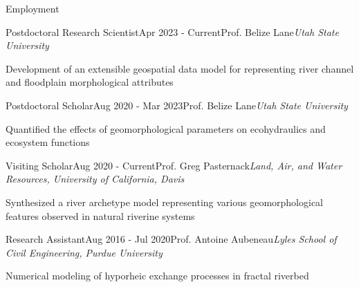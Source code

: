 \documentclass{resume_anzy} %
\begin{document}

\begin{rSection}{Employment}


\begin{rSubsection}{Postdoctoral Research Scientist}{Apr 2023 - Current}{Prof. Belize Lane}{\textit{Utah State University}}
\item  Development of an extensible geospatial data model for representing river channel and floodplain morphological attributes 
\end{rSubsection}

\begin{rSubsection}{Postdoctoral Scholar}{Aug 2020 - Mar 2023}{Prof. Belize Lane}{\textit{Utah State University}}
\item  Quantified the effects of geomorphological parameters on ecohydraulics and ecosystem functions
\end{rSubsection}

\vspace{-2.5mm}
\begin{rSubsection}{Visiting Scholar}{Aug 2020 - Current}{Prof. Greg Pasternack}{\textit{Land, Air, and Water Resources, University of California, Davis}}
\item  Synthesized a river archetype model representing various geomorphological features observed in natural riverine systems
\end{rSubsection}

\vspace{-2.5mm}
\begin{rSubsection}{Research Assistant}{Aug 2016 - Jul 2020}{Prof. Antoine Aubeneau}{\textit{Lyles School of Civil Engineering, Purdue University}}
\item Numerical modeling of hyporheic exchange processes in fractal riverbed
\end{rSubsection}




\end{rSection}
\end{document}
